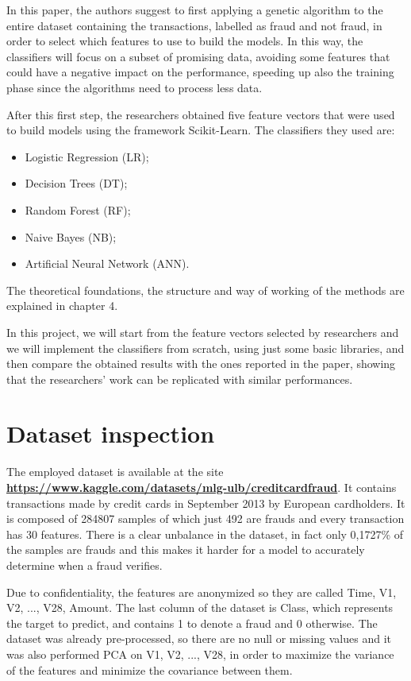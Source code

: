 \documentclass{Configuration_Files/PoliMi3i_thesis}
\begin{document}
In this paper, the authors suggest to first applying a genetic algorithm to the entire dataset containing the transactions, labelled as fraud and not fraud, in order to select which features to use to build the models.
In this way, the classifiers will focus on a subset of promising data, avoiding some features that could have a negative impact on the performance, speeding up also the training phase since the algorithms need to process less data.

After this first step, the researchers obtained five feature vectors that were used to build models using the framework Scikit-Learn. The classifiers they used are:
\begin{itemize}
    \item Logistic Regression (LR);
    \item Decision Trees (DT);
    \item Random Forest (RF);
    \item Naive Bayes (NB);
    \item Artificial Neural Network (ANN).
\end{itemize}
The theoretical foundations, the structure and way of working of the methods are explained in chapter 4.

In this project, we will start from the feature vectors selected by researchers and we will implement the classifiers from scratch, using just some basic libraries, and then compare the obtained results with the ones reported in the paper, showing that the researchers' work can be replicated with similar performances.

\chapter{Dataset inspection}
The employed dataset is available at the site \href{https://www.kaggle.com/datasets/mlg-ulb/creditcardfraud}{\textbf{https://www.kaggle.com/datasets/mlg-ulb/creditcardfraud}}. It contains transactions made by credit cards in September 2013 by European cardholders. It is composed of 284807 samples of which just 492 are frauds and every transaction has 30 features.
There is a clear unbalance in the dataset, in fact only 0,1727\% of the samples are frauds and this makes it harder for a model to accurately determine when a fraud verifies.

Due to confidentiality, the features are anonymized so they are called \textsf{Time, V1, V2, ..., V28, Amount}. The last column of the dataset is \textsf{Class}, which represents the target to predict, and contains 1 to denote a fraud and 0 otherwise. The dataset was already pre-processed, so there are no null or missing values and it was also performed PCA on \textsf{V1, V2, ..., V28}, in order to maximize the variance of the features and minimize the covariance between them.
\end{document}
